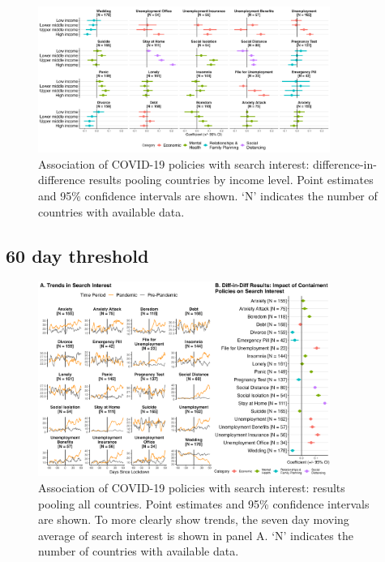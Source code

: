 \documentclass{article}
\begin{document}
\begin{figure}[H]
    \centering
    \includegraphics[width=0.85\textwidth]{figures/did_income_30.png}
    \caption{Association of COVID-19 policies with search interest: difference-in-difference results pooling countries by income level. Point estimates and 95\% confidence intervals are shown. `N' indicates the number of countries with available data.}
    \label{fig:did_income_30}
\end{figure}

\newpage
\subsection{60 day threshold}

\begin{figure}[H]
    \centering
    \includegraphics[width=0.85\textwidth]{figures/did_overall_60.png}
    \caption{Association of COVID-19 policies with search interest: results pooling all countries. Point estimates and 95\% confidence intervals are shown. To more clearly show trends, the seven day moving average of search interest is shown in panel A. `N' indicates the number of countries with available data.}
    \label{fig:lockdown_impact_60}
\end{figure}
\end{document}
